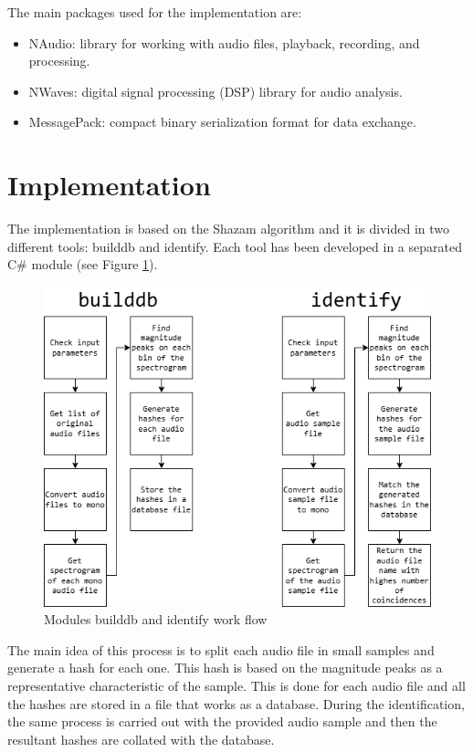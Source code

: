 \documentclass[11pt, a4paper]{article}
\begin{document}
    The main packages used for the implementation are:
    \begin{itemize}
        \item NAudio: library for working with audio files, playback, recording, and processing.
        \item NWaves: digital signal processing (DSP) library for audio analysis.
        \item MessagePack: compact binary serialization format for data exchange.
    \end{itemize}

    \newpage

    \section{Implementation}

    The implementation is based on the Shazam algorithm \cite{ShazamAlgorithmPaper} and it is divided in two different tools: builddb 
    and identify. Each tool has been developed in a separated C\# module (see Figure \ref{fig:builddb_identify_block_diagram}).

    \begin{figure}[H]
        \centering
        \includegraphics[width=\textwidth]{media/builddb_identify_block_diagram.png}
        \caption{Modules builddb and identify work flow}
        \label{fig:builddb_identify_block_diagram}
    \end{figure}

    The main idea of this process is to split each audio file in small samples and generate a hash for each one. This hash is based on the 
    magnitude peaks as a representative characteristic of the sample. This is done for each audio file and all the hashes are stored in a file 
    that works as a database. During the identification, the same process is carried out with the provided audio sample and then the resultant 
    hashes are collated with the database.
\end{document}
